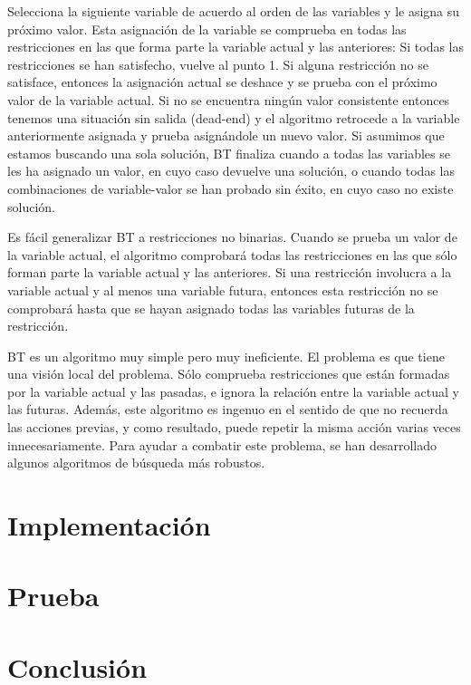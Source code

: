 \documentclass[a4paper]{article}
\begin{document}
Selecciona la siguiente variable de acuerdo al orden de las variables y le asigna su próximo valor. 
Esta asignación de la variable se comprueba en todas las restricciones en las que forma parte la variable actual y las anteriores:
Si todas las restricciones se han satisfecho, vuelve al punto 1.
Si alguna restricción no se satisface, entonces la asignación actual se deshace y se prueba con el próximo valor de la variable actual. 
Si no se encuentra ningún valor consistente entonces tenemos una situación sin salida (dead-end) y el algoritmo retrocede a la variable anteriormente asignada y prueba asignándole un nuevo valor.
Si asumimos que estamos buscando una sola solución, BT finaliza cuando a todas las variables se les ha asignado un valor, en cuyo caso devuelve una solución, o cuando todas las combinaciones de variable-valor se han probado sin éxito, en cuyo caso no existe solución.

Es fácil generalizar BT a restricciones no binarias. Cuando se prueba un valor de la variable actual, el algoritmo comprobará todas las restricciones en las que sólo forman parte la variable actual y las anteriores. Si una restricción involucra a la variable actual y al menos una variable futura, entonces esta restricción no se comprobará hasta que se hayan asignado todas las variables futuras de la restricción.

BT es un algoritmo muy simple pero muy ineficiente. El problema es que tiene una visión local del problema. Sólo comprueba restricciones que están formadas por la variable actual y las pasadas, e ignora la relación entre la variable actual y las futuras. Además, este algoritmo es ingenuo en el sentido de que no recuerda las acciones previas, y como resultado, puede repetir la misma acción varias veces innecesariamente. Para ayudar a combatir este problema, se han desarrollado algunos algoritmos de búsqueda más robustos.

 



 





\section{Implementaci\'on}

\section{Prueba}

\section{Conclusi\'on}
\end{document}
